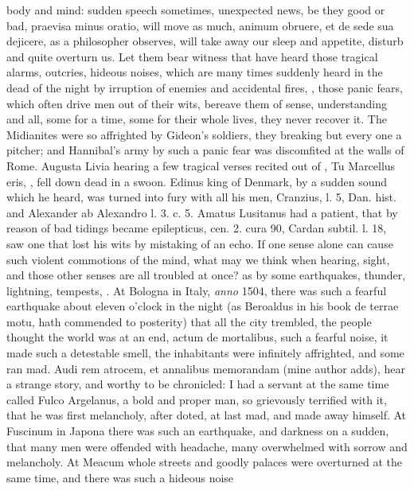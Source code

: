 {body and mind: sudden speech sometimes, unexpected news, be they good
or bad, praevisa minus oratio, will move as much, animum obruere, et de
sede sua dejicere, as a philosopher observes, will take away our
sleep and appetite, disturb and quite overturn us. Let them bear
witness that have heard those tragical alarms, outcries, hideous
noises, which are many times suddenly heard in the dead of the night by
irruption of enemies and accidental fires, \etc{}, those panic
fears, which often drive men out of their wits, bereave them of sense,
understanding and all, some for a time, some for their whole lives,
they never recover it. The  Midianites were so affrighted by
Gideon's soldiers, they breaking but every one a pitcher; and
Hannibal's army by such a panic fear was discomfited at the walls
of Rome. Augusta Livia hearing a few tragical verses recited out of
\Virgil{}, Tu Marcellus eris, \etc{}, fell down dead in a swoon. Edinus king
of Denmark, by a sudden sound which he heard,  was turned into
fury with all his men, Cranzius, l. 5, Dan. hist. and Alexander ab
Alexandro l. 3. c. 5. Amatus Lusitanus had a patient, that by reason of
bad tidings became epilepticus, cen. 2. cura 90, Cardan subtil. l. 18,
saw one that lost his wits by mistaking of an echo. If one sense alone
can cause such violent commotions of the mind, what may we think when
hearing, sight, and those other senses are all troubled at once? as by
some earthquakes, thunder, lightning, tempests, \etc{}. At Bologna in
Italy, \emph{anno} 1504, there was such a fearful earthquake about eleven
o'clock in the night (as Beroaldus in his book de terrae motu,
hath commended to posterity) that all the city trembled, the people
thought the world was at an end, actum de mortalibus, such a fearful
noise, it made such a detestable smell, the inhabitants were infinitely
affrighted, and some ran mad. Audi rem atrocem, et annalibus memorandam
(mine author adds), hear a strange story, and worthy to be chronicled:
I had a servant at the same time called Fulco Argelanus, a bold and
proper man, so grievously terrified with it, that he was first
melancholy, after doted, at last mad, and made away himself. At
Fuscinum in Japona there was such an earthquake, and darkness on
a sudden, that many men were offended with headache, many overwhelmed
with sorrow and melancholy. At Meacum whole streets and goodly palaces
were overturned at the same time, and there was such a hideous noise
}
